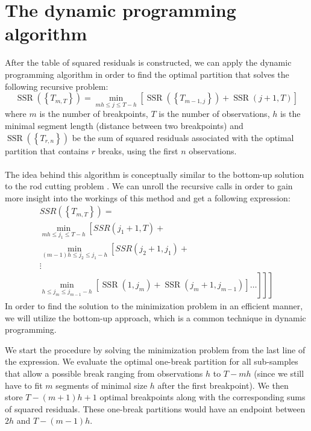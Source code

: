 \documentclass[main.tex]{subfiles}
\begin{document}
\section{The dynamic programming algorithm}
\label{sec:dynamic_algorithm}
After the table of squared residuals is constructed, we can apply the dynamic
programming algorithm in order to find the optimal partition that solves the
following recursive problem:
\[
\operatorname{SSR}\left(\left\{T_{m, T}\right\}\right)=\min _{m h \leq j \leq
  T-h}\left[\operatorname{SSR}\left(\left\{T_{m-1,
    j}\right\}\right)+\operatorname{SSR}(j+1, T)\right]
\]
where $m$ is the number of breakpoints, $T$ is the number of observations,
$h$ is the minimal segment length (distance between two breakpoints) and
$\operatorname{SSR}\left(\left\{T_{r, n}\right\}\right)$ be the sum of squared
residuals associated with the optimal partition that contains $r$ breaks, using
the first $n$ observations.\\\\
The idea behind this algorithm is conceptually similar to the bottom-up solution to
the rod cutting problem \cite{CLRS_rod}.
We can unroll the recursive calls in order to gain more insight into the workings of this method
and get a following expression:
\[
\begin{array}{c}
  S S R\left(\left\{T_{m, T}\right\}\right)= \\
  \min _{m h \leq j_{1} \leq T-h}\left[S S R\left(j_{1}+1, T\right)+\right. \\
  \min _{(m-1) h \leq j_{2} \leq j_{1}-h}\left[S S R\left(j_{2}+1, j_{1}\right)+\right. \\
  \vdots \\
  \left.\left.\left.\min _{h \leq j_{m} \leq j_{m-1}-h}
  \left[\operatorname{SSR}\left(1, j_{m}\right)+\operatorname{SSR}\left(j_{m}+1, j_{m-1}\right)\right]
  \ldots\right]\right]\right]
\end{array}
\]
In order to find the solution to the minimization problem in an efficient
manner, we will utilize the bottom-up approach, which is a common technique in
dynamic programming.

We start the procedure by solving the minimization problem from the
last line of the expression. We evaluate the optimal one-break partition for all
sub-samples that allow a possible break ranging from observations $h$ to
$T - mh$ (since we still have to fit $m$ segments of minimal size $h$ after
the first breakpoint). We then store $T - (m + 1)h + 1$ optimal breakpoints
along with the corresponding sums of squared residuals. These one-break
partitions would have an endpoint between $2h$ and $T - (m-1)h$. 
\end{document}
